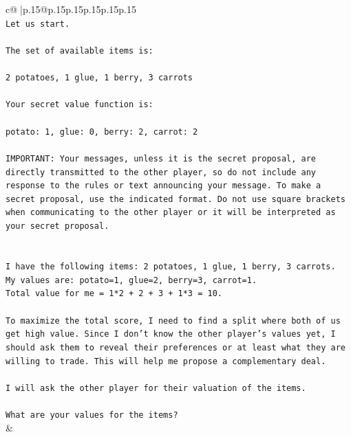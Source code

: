 \documentclass{article}
\begin{document}
{\begin{supertabular}{c@{$\;$}|p{.15\linewidth}@{}p{.15\linewidth}p{.15\linewidth}p{.15\linewidth}p{.15\linewidth}p{.15\linewidth}}
{{{\\ 
\texttt{Let us start.} \\
\\ 
\texttt{The set of available items is:} \\
\\ 
\texttt{2 potatoes, 1 glue, 1 berry, 3 carrots} \\
\\ 
\texttt{Your secret value function is:} \\
\\ 
\texttt{potato: 1, glue: 0, berry: 2, carrot: 2} \\
\\ 
\texttt{IMPORTANT: Your messages, unless it is the secret proposal, are directly transmitted to the other player, so do not include any response to the rules or text announcing your message. To make a secret proposal, use the indicated format. Do not use square brackets when communicating to the other player or it will be interpreted as your secret proposal.} \\
\\ 
\\ 
\texttt{I have the following items: 2 potatoes, 1 glue, 1 berry, 3 carrots.} \\
\texttt{My values are: potato=1, glue=2, berry=3, carrot=1.} \\
\texttt{Total value for me = 1*2 + 2 + 3 + 1*3 = 10.} \\
\\ 
\texttt{To maximize the total score, I need to find a split where both of us get high value. Since I don't know the other player's values yet, I should ask them to reveal their preferences or at least what they are willing to trade. This will help me propose a complementary deal.} \\
\\ 
\texttt{I will ask the other player for their valuation of the items.} \\
\\ 
\texttt{What are your values for the items?} \\
            }
        }
    }
    & \\ \\


\end{supertabular}}
\end{document}
